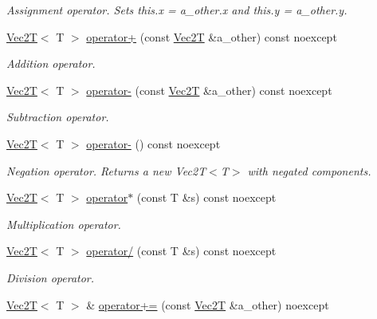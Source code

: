 \begin{DoxyCompactItemize}
\begin{DoxyCompactList}\small\item\em Assignment operator. Sets this.\+x = a\+\_\+other.\+x and this.\+y = a\+\_\+other.\+y. \end{DoxyCompactList}\item 
\hyperlink{classVec2T}{Vec2T}$<$ T $>$ \hyperlink{classVec2T_a0ea1e944e722dfdc3a37ebd7ef922eea}{operator+} (const \hyperlink{classVec2T}{Vec2T} \&a\+\_\+other) const noexcept
\begin{DoxyCompactList}\small\item\em Addition operator. \end{DoxyCompactList}\item 
\hyperlink{classVec2T}{Vec2T}$<$ T $>$ \hyperlink{classVec2T_a788b057579c3c92068e15595d7781734}{operator-\/} (const \hyperlink{classVec2T}{Vec2T} \&a\+\_\+other) const noexcept
\begin{DoxyCompactList}\small\item\em Subtraction operator. \end{DoxyCompactList}\item 
\mbox{\label{classVec2T_aa8176b9c1a1331f1b0358188cd04883f}} 
\hyperlink{classVec2T}{Vec2T}$<$ T $>$ \hyperlink{classVec2T_aa8176b9c1a1331f1b0358188cd04883f}{operator-\/} () const noexcept
\begin{DoxyCompactList}\small\item\em Negation operator. Returns a new Vec2\+T$<$\+T$>$ with negated components. \end{DoxyCompactList}\item 
\hyperlink{classVec2T}{Vec2T}$<$ T $>$ \hyperlink{classVec2T_a1047f21e704d25c4bc5980cd13c00e1c}{operator$\ast$} (const T \&s) const noexcept
\begin{DoxyCompactList}\small\item\em Multiplication operator. \end{DoxyCompactList}\item 
\hyperlink{classVec2T}{Vec2T}$<$ T $>$ \hyperlink{classVec2T_a3cc96a6930ed713df486d177490e1e5c}{operator/} (const T \&s) const noexcept
\begin{DoxyCompactList}\small\item\em Division operator. \end{DoxyCompactList}\item 
\hyperlink{classVec2T}{Vec2T}$<$ T $>$ \& \hyperlink{classVec2T_a6f5fbfd88dc2eac09f17fb999c76e5b0}{operator+=} (const \hyperlink{classVec2T}{Vec2T} \&a\+\_\+other) noexcept

\end{DoxyCompactItemize}
